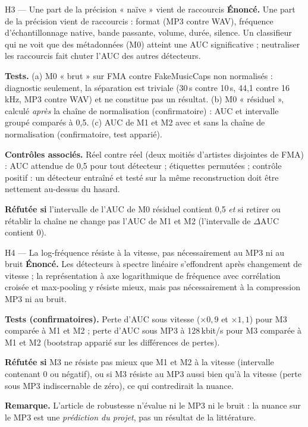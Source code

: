 \documentclass[11pt,a4paper]{article}
\newcommand{\AUC}{\textrm{AUC}}
\begin{document}
\begin{hyp}{H3 --- Une part de la précision « naïve » vient de raccourcis}
\textbf{Énoncé.} Une part de la précision vient de raccourcis : format (MP3 contre WAV), fréquence d'échantillonnage native, bande passante, volume, durée, silence. Un classifieur qui ne voit que des métadonnées (M0) atteint une AUC significative ; neutraliser les raccourcis fait chuter l'AUC des autres détecteurs.

\textbf{Tests.} (a) M0 « brut » sur FMA contre FakeMusicCaps non normalisés : diagnostic seulement, la séparation est triviale (30\,s contre 10\,s, 44,1 contre 16\,kHz, MP3 contre WAV) et ne constitue pas un résultat. (b) M0 « résiduel », calculé \emph{après} la chaîne de normalisation (confirmatoire) : AUC et intervalle groupé comparés à 0,5. (c) AUC de M1 et M2 avec et sans la chaîne de normalisation (confirmatoire, test apparié).

\textbf{Contrôles associés.} Réel contre réel (deux moitiés d'artistes disjointes de FMA) : AUC attendue de 0,5 pour tout détecteur ; étiquettes permutées ; contrôle positif : un détecteur entraîné et testé sur la même reconstruction doit être nettement au-dessus du hasard.

\textbf{Réfutée si} l'intervalle de l'AUC de M0 résiduel contient 0,5 \emph{et} si retirer ou rétablir la chaîne ne change pas l'AUC de M1 et M2 (l'intervalle de $\Delta\AUC$ contient 0).
\end{hyp}

\begin{hyp}{H4 --- La log-fréquence résiste à la vitesse, pas nécessairement au MP3 ni au bruit}
\textbf{Énoncé.} Les détecteurs à spectre linéaire s'effondrent après changement de vitesse ; la représentation à axe logarithmique de fréquence avec corrélation croisée et max-pooling y résiste mieux, mais pas nécessairement à la compression MP3 ni au bruit.

\textbf{Tests (confirmatoires).} Perte d'AUC sous vitesse ($\times 0{,}9$ et $\times 1{,}1$) pour M3 comparée à M1 et M2 ; perte d'AUC sous MP3 à 128\,kbit/s pour M3 comparée à M1 et M2 (bootstrap apparié sur les différences de pertes).

\textbf{Réfutée si} M3 ne résiste pas mieux que M1 et M2 à la vitesse (intervalle contenant 0 ou négatif), ou si M3 résiste au MP3 aussi bien qu'à la vitesse (perte sous MP3 indiscernable de zéro), ce qui contredirait la nuance.

\textbf{Remarque.} L'article de robustesse n'évalue ni le MP3 ni le bruit : la nuance sur le MP3 est une \emph{prédiction du projet}, pas un résultat de la littérature.
\end{hyp}
\end{document}
